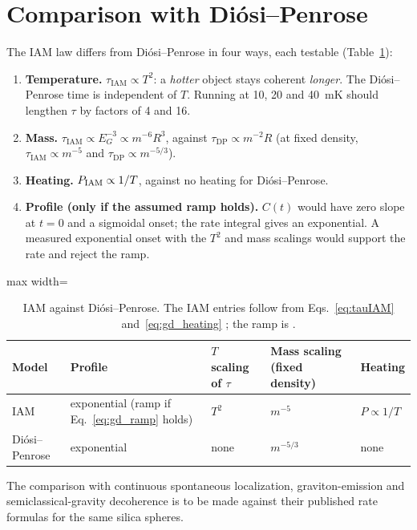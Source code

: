 \section{Comparison with Di\'osi--Penrose}\label{sec:gd_compare}
The IAM law differs from Di\'osi--Penrose in four ways, each testable (Table~\ref{tab:gd_compare}):
\begin{enumerate}
 \item \textbf{Temperature.} $\tau_{\mathrm{IAM}}\propto T^2$: a \emph{hotter} object stays coherent \emph{longer}. The Di\'osi--Penrose time is independent
       of $T$. Running at 10, 20 and 40~mK should lengthen $\tau$ by factors of 4 and 16.
 \item \textbf{Mass.} $\tau_{\mathrm{IAM}}\propto E_G^{-3}\propto m^{-6}R^3$, against $\tau_{\mathrm{DP}}\propto m^{-2}R$ (at fixed density,
       $\tau_{\mathrm{IAM}}\propto m^{-5}$ and $\tau_{\mathrm{DP}}\propto m^{-5/3}$).
 \item \textbf{Heating.} $P_{\rm IAM}\propto1/T$, against no heating for Di\'osi--Penrose.
 \item \textbf{Profile (only if the assumed ramp holds).} $C(t)$ would have zero slope at $t=0$ and a sigmoidal onset; the rate integral gives an exponential.
       A measured exponential onset with the $T^2$ and mass scalings would support the rate and reject the ramp.
\end{enumerate}

\begin{table}[htbp]\centering\small
\caption{IAM against Di\'osi--Penrose. The IAM entries follow from Eqs.~\eqref{eq:tauIAM} and~\eqref{eq:gd_heating} \calc; the ramp is \conjecture.}\label{tab:gd_compare}
\begin{adjustbox}{max width=\textwidth}
\begin{tabular}{lllll}
\hline
Model & Profile & $T$ scaling of $\tau$ & Mass scaling (fixed density) & Heating\\\hline
IAM & exponential (ramp if Eq.~\eqref{eq:gd_ramp} holds) & $T^2$ & $m^{-5}$ & $P\propto1/T$\\
Di\'osi--Penrose & exponential & none & $m^{-5/3}$ & none\\\hline
\end{tabular}
\end{adjustbox}
\end{table}
The comparison with continuous spontaneous localization, graviton-emission and semiclassical-gravity decoherence is to be made against their published rate
formulas for the same silica spheres. \openprob

